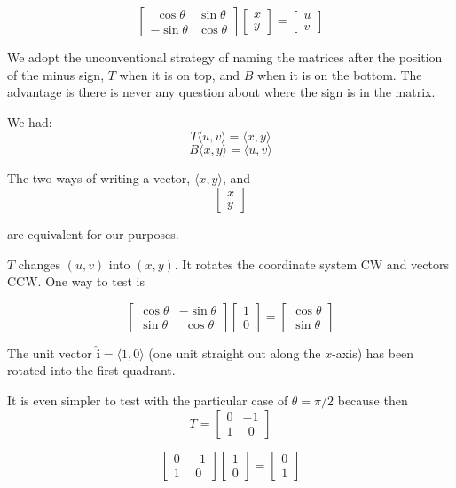 \documentclass[11pt, oneside]{article}
\begin{document}
\[
\begin{bmatrix}  
\ \ \cos \theta & \sin \theta \\
-\sin \theta & \cos \theta
\end{bmatrix}
\begin{bmatrix}  
x \\
y
\end{bmatrix}
=
\begin{bmatrix}  
u \\
v
\end{bmatrix}
\]

We adopt the unconventional strategy of naming the matrices after the position of the minus sign, $T$ when it is on top, and $B$ when it is on the bottom.  The advantage is there is never any question about where the sign is in the matrix.

We had:
\[ T  \langle u,v \rangle = \langle x,y \rangle \]
\[ B  \langle x,y \rangle = \langle u,v \rangle \]

The two ways of writing a vector,  $\langle x,y \rangle$, and 
\[
\begin{bmatrix}  
x \\
y
\end{bmatrix}
\]

are equivalent for our purposes.

$T$ changes $(u,v)$ into $(x,y)$.  It rotates the coordinate system CW and vectors CCW.   One way to test is

\[
\begin{bmatrix}  
\cos \theta & -\sin \theta \\
\sin \theta & \ \ \cos \theta
\end{bmatrix}
\begin{bmatrix}
1 \\
0
\end{bmatrix}
=
\begin{bmatrix}  
\cos \theta \\
\sin \theta
\end{bmatrix}
\]

The unit vector $\mathbf{\hat{i}} = \langle 1, 0 \rangle$ (one unit straight out along the $x$-axis) has been rotated into the first quadrant.

It is even simpler to test with the particular case of $\theta = \pi/2$ because then
\[ 
T=
\begin{bmatrix}  
0 & -1 \\
1 & \ \ 0
\end{bmatrix}
\]

\[
\begin{bmatrix}  
0 & -1 \\
1 & \ \ 0
\end{bmatrix}
\begin{bmatrix}
1 \\
0
\end{bmatrix}
=
\begin{bmatrix}  
0 \\
1
\end{bmatrix}
\]
\end{document}
